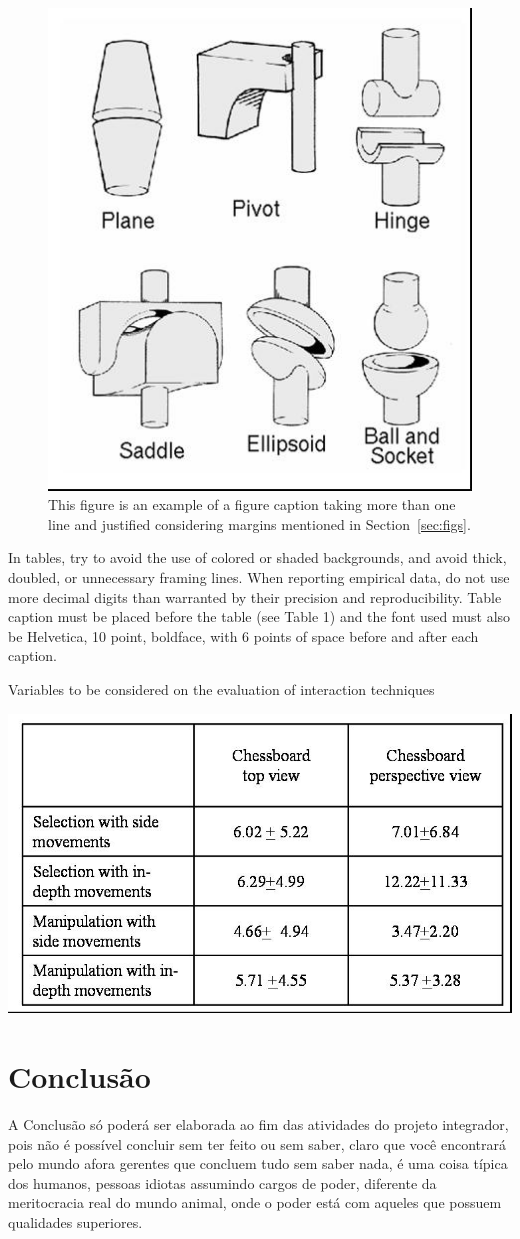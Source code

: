 \documentclass[12pt]{article}
\begin{document}
\begin{figure}[ht]
\centering
\includegraphics[width=.3\textwidth]{fig2.jpg}
\caption{This figure is an example of a figure caption taking more than one
  line and justified considering margins mentioned in Section~\ref{sec:figs}.}
\label{fig:exampleFig2}
\end{figure}

In tables, try to avoid the use of colored or shaded backgrounds, and avoid
thick, doubled, or unnecessary framing lines. When reporting empirical data,
do not use more decimal digits than warranted by their precision and
reproducibility. Table caption must be placed before the table (see Table 1)
and the font used must also be Helvetica, 10 point, boldface, with 6 points of
space before and after each caption.

\begin{table}[ht]
\centering
\caption{Variables to be considered on the evaluation of interaction
  techniques}
\label{tab:exTable1}
\includegraphics[width=.7\textwidth]{table.jpg}
\end{table}

\section{Conclusão}

A Conclusão só poderá ser elaborada ao fim das atividades do projeto integrador, pois não é possível concluir sem ter feito ou sem saber, claro que você encontrará pelo mundo afora gerentes que concluem tudo sem saber nada, é uma coisa típica dos humanos, pessoas idiotas assumindo cargos de poder, diferente da meritocracia real do mundo animal, onde o poder está com aqueles que possuem qualidades superiores.
\end{document}
